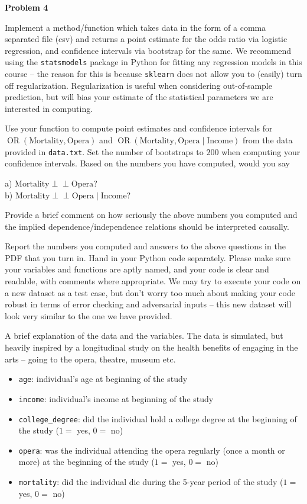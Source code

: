 \documentclass[letterpaper, 11pt]{article}
\newcommand{\problemAnswer}[1]{%
\noindent\framebox[0.95\columnwidth][c]{\begin{minipage}{0.92\columnwidth}\color{blue}{#1}\end{minipage}} %
}
\DeclareMathOperator{\odds}{\text{OR}}
\def\ci{\perp\!\!\!\perp}
\begin{document}
\vspace{1em}
{\Large\textbf{Problem 4}}

Implement a method/function which takes data in the form of a comma separated file (csv) and returns a point estimate for the odds ratio via logistic regression, and confidence intervals via bootstrap for the same. We recommend using the \texttt{statsmodels} package in Python for fitting any regression models in this course -- the reason for this is because \texttt{sklearn} does not allow you to (easily) turn off regularization. Regularization is useful when considering out-of-sample prediction, but will bias your estimate of the statistical parameters we are interested in computing.

Use your function to compute point estimates and confidence intervals for \linebreak $\odds(\text{Mortality}, \text{Opera})$ and $\odds(\text{Mortality}, \text{Opera} \mid \text{Income})$ from the data provided in \texttt{data.txt}. Set the number of bootstraps to $200$ when computing your confidence intervals. Based on the numbers you have computed, would you say\

a) $\text{Mortality} \ci \text{Opera}$?\\
b) $\text{Mortality} \ci \text{Opera} \mid \text{Income}$?

Provide a brief comment on how seriously the above numbers you computed and the implied dependence/independence relations should be interpreted causally.

Report the numbers you computed and answers to the above questions in the PDF that you turn in. Hand in your Python code separately. Please make sure your variables and functions are aptly named, and your code is clear and readable, with comments where appropriate. We may try to execute your code on a new dataset as a test case, but don't worry too much about making your code robust in terms of error checking and adversarial inputs -- this new dataset will look very similar to the one we have provided.

A brief explanation of the data and the variables. The data is simulated, but heavily inspired by a longitudinal study on the health benefits of engaging in the arts -- going to the opera, theatre, museum etc.
\begin{itemize}
	\item \texttt{age}: individual's age at beginning of the study
	\item \texttt{income}: individual's income at beginning of the study
	\item \texttt{college\_degree}: did the individual hold a college degree at the beginning of the study ($1=$ yes, $0=$ no)
	\item \texttt{opera}: was the individual attending the opera regularly (once a month or more) at the beginning of the study ($1=$ yes, $0=$ no)
	\item \texttt{mortality}: did the individual die during the 5-year period of the study ($1=$ yes, $0=$ no)
\end{itemize}

\problemAnswer{
Write your answer here. 
\vspace*{300pt}
}
\end{document}
